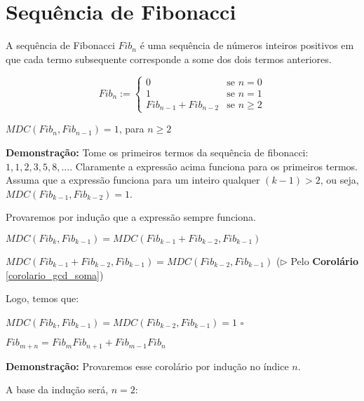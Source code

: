
\section{Sequência de Fibonacci}

\begin{definition}
A sequência de Fibonacci $Fib_n$ é uma sequência de números inteiros positivos em que cada termo subsequente corresponde a some dos dois termos anteriores.

\[
 Fib_n :=
  \begin{cases}
   0 & \text{se } n = 0 \\
   1 & \text{se } n = 1 \\
   Fib_{n-1} + Fib_{n-2} & \text{se } n \geq 2
  \end{cases}
\]
\end{definition}


\begin{proposition}\label{gcd_consecutivo_fib}
$MDC(Fib_n, Fib_{n-1}) = 1$, para $n \geq 2$
\end{proposition}
\textbf{Demonstração:}
Tome os primeiros termos da sequência de fibonacci: $1, 1, 2, 3, 5, 8,...$.
Claramente a expressão acima funciona para os primeiros termos.
Assuma que a expressão funciona para um inteiro qualquer $(k-1) > 2$, ou seja, $MDC(Fib_{k-1}, Fib_{k-2}) = 1$.

Provaremos por indução que a expressão sempre funciona.

$MDC(Fib_{k}, Fib_{k-1}) = MDC(Fib_{k-1} + Fib_{k-2}, Fib_{k-1})$

$MDC(Fib_{k-1} + Fib_{k-2}, Fib_{k-1}) = MDC(Fib_{k-2}, Fib_{k-1})$ ($\triangleright$ Pelo \textbf{Corolário} \autoref{corolario_gcd_soma})

Logo, temos que:

$MDC(Fib_{k}, Fib_{k-1}) = MDC(Fib_{k-2}, Fib_{k-1}) = 1$ $\square$



\begin{proposition}\label{gcd_combinacao_fib}
$Fib_{m+n} = Fib_mFib_{n+1} + Fib_{m-1}Fib_n$
\end{proposition}
\textbf{Demonstração:} Provaremos esse corolário por indução no índice $n$.

A base da indução será, $n=2$:

